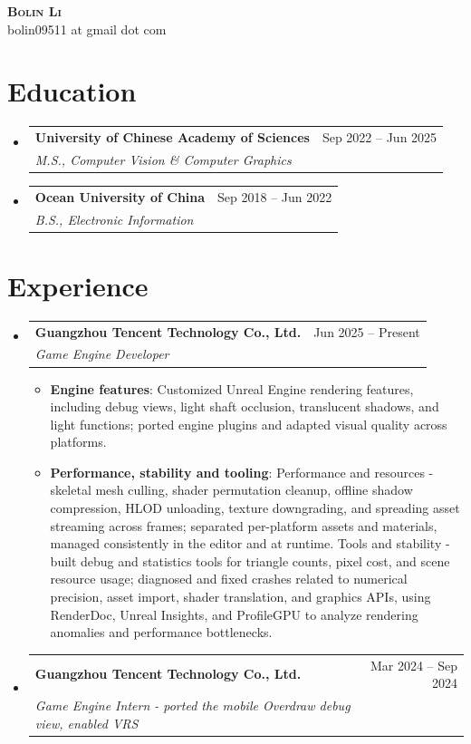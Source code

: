 \documentclass[a4paper,11pt]{article}
\makeatletter
\newcommand{\resumeItem}[1]{\item\small{#1 \vspace{-2pt}}}
\newcommand{\resumeSubheading}[4]{
  \vspace{-2pt}\item
    \begin{tabular*}{0.97\textwidth}[t]{l@{\extracolsep{\fill}}r}
      \textbf{#1} & #2 \\
      \textit{\small#3} & \textit{\small #4} \\
    \end{tabular*}\vspace{-7pt}
}
\newcommand{\resumeSubHeadingListStart}{\begin{itemize}[leftmargin=0.15in, label={}]}
\newcommand{\resumeSubHeadingListEnd}{\end{itemize}}
\newcommand{\resumeItemListStart}{\begin{itemize}}
\newcommand{\resumeItemListEnd}{\end{itemize}\vspace{-5pt}}
\makeatother
\begin{document}
\begin{center}
    \textbf{\Huge \scshape Bolin Li} \\ \vspace{1pt}
    \small bolin09511 at gmail dot com
\end{center}

\section{Education}
  \resumeSubHeadingListStart
    \resumeSubheading
      {University of Chinese Academy of Sciences}{Sep 2022 -- Jun 2025}
      {M.S., Computer Vision \& Computer Graphics}{}
    \resumeSubheading
      {Ocean University of China}{Sep 2018 -- Jun 2022}
      {B.S., Electronic Information}{}
  \resumeSubHeadingListEnd

\section{Experience}
  \resumeSubHeadingListStart
    \resumeSubheading
      {Guangzhou Tencent Technology Co., Ltd.}{Jun 2025 -- Present}
      {Game Engine Developer}{}
      \resumeItemListStart
        \resumeItem{\textbf{Engine features}: Customized Unreal Engine rendering features, including debug views, light shaft occlusion, translucent shadows, and light functions; ported engine plugins and adapted visual quality across platforms.}
        \resumeItem{\textbf{Performance, stability and tooling}: Performance and resources - skeletal mesh culling, shader permutation cleanup, offline shadow compression, HLOD unloading, texture downgrading, and spreading asset streaming across frames; separated per-platform assets and materials, managed consistently in the editor and at runtime. Tools and stability - built debug and statistics tools for triangle counts, pixel cost, and scene resource usage; diagnosed and fixed crashes related to numerical precision, asset import, shader translation, and graphics APIs, using RenderDoc, Unreal Insights, and ProfileGPU to analyze rendering anomalies and performance bottlenecks.}
      \resumeItemListEnd
    \resumeSubheading
      {Guangzhou Tencent Technology Co., Ltd.}{Mar 2024 -- Sep 2024}
      {Game Engine Intern - ported the mobile Overdraw debug view, enabled VRS}{}
  \resumeSubHeadingListEnd
\end{document}

